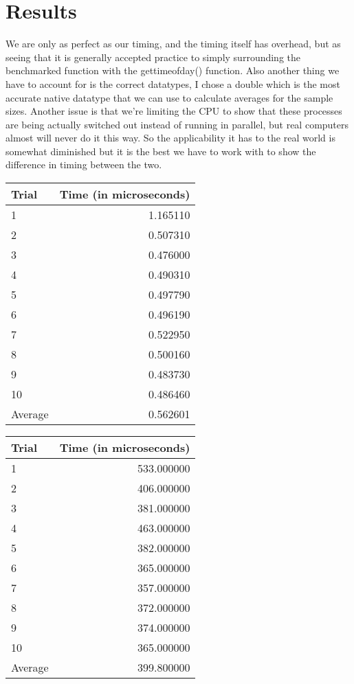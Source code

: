\documentclass[12pt,letterpaper]{article}
\begin{document}
	\section{Results}
	We are only as perfect as our timing, and the timing itself has overhead, but as seeing that it is generally accepted practice to simply surrounding the benchmarked function with the gettimeofday() function. Also another thing we have to account for is the correct datatypes, I chose a double which is the most accurate native datatype that we can use to calculate averages for the sample sizes. Another issue is that we're limiting the CPU to show that these processes are being actually switched out instead of running in parallel, but real computers almost will never do it this way. So the applicability it has to the real world is somewhat diminished but it is the best we have to work with to show the difference in timing between the two.
	\begin{center}
	\begin{tabular}{l | r}
		Trial & Time (in microseconds) \\ \hline
		1 & 1.165110 \\
		2 & 0.507310 \\
		3 & 0.476000 \\
		4 & 0.490310 \\
		5 & 0.497790 \\
		6 & 0.496190 \\
		7 & 0.522950 \\
		8 & 0.500160 \\
		9 & 0.483730 \\
		10 & 0.486460 \\ \hline
		Average & 0.562601
	\end{tabular}
	\begin{tabular}{l | r}
		Trial & Time (in microseconds) \\ \hline
		1 & 533.000000 \\
		2 & 406.000000 \\
		3 & 381.000000 \\
		4 & 463.000000 \\
		5 & 382.000000 \\
		6 & 365.000000 \\
		7 & 357.000000 \\
		8 & 372.000000 \\
		9 & 374.000000 \\
		10 & 365.000000 \\ \hline
		Average & 399.800000
	\end{tabular}
	\end{center}
\end{document}
